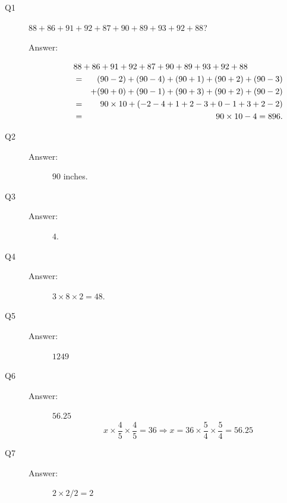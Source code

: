 \documentclass{article}
\begin{document}
\begin{description}

\item[Q1] $88+86+91+92+87+90+89+93+92+88$?

\begin{description}
\item[Answer:] 
\begin{eqnarray*}
\lefteqn{
88+86+91+92+87+90+89+93+92+88}
\\
&=&
(90 - 2)
+ (90 - 4)
+ (90 + 1)
+ (90 + 2)
+ (90 - 3)
\\
&&
+ (90 + 0)
+ (90 - 1)
+ (90 + 3)
+ (90 + 2)
+ (90 - 2)
\\
&=&
90 \times 10
+(- 2 - 4 + 1 + 2 - 3 + 0 - 1 + 3 + 2 - 2)
\\
&=&
90 \times 10 - 4 = 896.
\end{eqnarray*}
\end{description}


\item[Q2]
\begin{description}
\item[Answer:] $90$ inches.
\end{description}


\item[Q3]
\begin{description}
\item[Answer:] $4$.
\end{description}


\item[Q4]
\begin{description}
\item[Answer:] $3 \times 8 \times 2 = 48$.
\end{description}


\item[Q5]
\begin{description}
\item[Answer:] $1249$
\end{description}


\item[Q6]
\begin{description}
\item[Answer:] $56.25$
\begin{equation}
x \times \frac{4}{5} \times \frac{4}{5} = 36
\Rightarrow x = 36 \times \frac{5}{4} \times \frac{5}{4} = 56.25
\end{equation}
\end{description}


\item[Q7]
\begin{description}
\item[Answer:] $2 \times 2 / 2 = 2$
\end{description}



\end{description}
\end{document}
